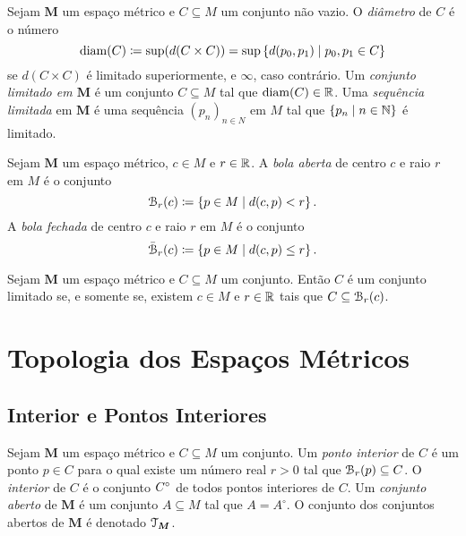 \begin{defi}
Sejam $\bm M$ um espaço métrico e $C \subseteq M$ um conjunto não vazio. O \emph{diâmetro} de $C$ é o número
	\begin{equation*}
	\operatorname{diam}(C) \coloneqq \sup(d(C \times C)) = \sup\left\{d(p_0,p_1) \;\middle\vert\; p_0,p_1 \in C \right\}
	\end{equation*}
se $d(C \times C)$ é limitado superiormente, e $\infty$, caso contrário. Um \emph{conjunto limitado em $\bm M$} é um conjunto $C \subseteq M$ tal que $\operatorname{diam}(C) \in \mathbb{R}$. Uma \emph{sequência limitada} em $\bm M$ é uma sequência $(p_n)_{n \in N}$ em $M$ tal que $\left\{p_n \;\middle\vert\; n \in \mathbb{N} \right\}$ é limitado.
\end{defi}

\begin{defi}
Sejam $\bm M$ um espaço métrico, $c \in M$ e $r \in \mathbb{R}$. A \emph{bola aberta} de centro $c$ e raio $r$ em $M$ é o conjunto
	\begin{equation*}
	\mathcal{B}_r(c) \coloneqq \left\{p \in M \;\middle\vert\; d(c,p) < r \right\}.
	\end{equation*}
A \emph{bola fechada} de centro $c$ e raio $r$ em $M$ é o conjunto
	\begin{equation*}
	\bar{\mathcal{B}}_r(c) \coloneqq \left\{p \in M \;\middle\vert\; d(c,p) \leq r \right\}.
	\end{equation*}
\end{defi}

\begin{prop}
Sejam $\bm M$ um espaço métrico e $C \subseteq M$ um conjunto. Então $C$ é um conjunto limitado se, e somente se, existem $c \in M$ e $r \in \mathbb{R}$ tais que $C \subseteq \mathcal{B}_r(c)$.
\end{prop}

\section{Topologia dos Espaços Métricos}

\subsection{Interior e Pontos Interiores}

\begin{defi}
Sejam $\bm M$ um espaço métrico e $C \subseteq M$ um conjunto. Um \emph{ponto interior} de $C$ é um ponto $p \in C$ para o qual existe um número real $r > 0$ tal que $\mathcal{B}_r(p) \subseteq C$. O \emph{interior} de $C$ é o conjunto ${C}^\circ$ de todos pontos interiores de $C$. Um \emph{conjunto aberto} de $\bm M$ é um conjunto $A \subseteq M$ tal que $A = A^\circ$. O conjunto dos conjuntos abertos de $\bm M$ é denotado $\mathcal{T}_{\bm M}$.
\end{defi}

